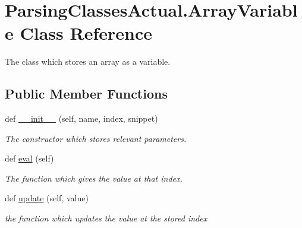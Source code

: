 \hypertarget{class_parsing_classes_actual_1_1_array_variable}{}\section{Parsing\+Classes\+Actual.\+Array\+Variable Class Reference}
\label{class_parsing_classes_actual_1_1_array_variable}


The class which stores an array as a variable.  


\subsection*{Public Member Functions}
\begin{DoxyCompactItemize}
\item 
def \hyperlink{class_parsing_classes_actual_1_1_array_variable_a8d1f844a7bd0c87083039e7d40c5d882}{\+\_\+\+\_\+init\+\_\+\+\_\+} (self, name, index, snippet)
\begin{DoxyCompactList}\small\item\em The constructor which stores relevant parameters. \end{DoxyCompactList}\item 
\mbox{\label{class_parsing_classes_actual_1_1_array_variable_a1e14b4cc90b00fca48dbf6e9dcf58628}} 
def \hyperlink{class_parsing_classes_actual_1_1_array_variable_a1e14b4cc90b00fca48dbf6e9dcf58628}{eval} (self)
\begin{DoxyCompactList}\small\item\em The function which gives the value at that index. \end{DoxyCompactList}\item 
def \hyperlink{class_parsing_classes_actual_1_1_array_variable_adb73630679e22d44052196d2135b55bc}{update} (self, value)
\begin{DoxyCompactList}\small\item\em the function which updates the value at the stored index \end{DoxyCompactList}\end{DoxyCompactItemize}
